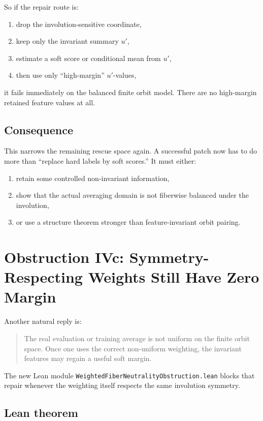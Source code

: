 \documentclass[11pt]{article}
\theoremstyle{remark}
\begin{document}
So if the repair route is:
\begin{enumerate}[leftmargin=1.5em]
  \item drop the involution-sensitive coordinate,
  \item keep only the invariant summary \(u'\),
  \item estimate a soft score or conditional mean from \(u'\),
  \item then use only ``high-margin'' \(u'\)-values,
\end{enumerate}
it fails immediately on the balanced finite orbit model.  There are no high-margin retained
feature values at all.

\subsection{Consequence}

This narrows the remaining rescue space again.  A successful patch now has to do more than
``replace hard labels by soft scores.''  It must either:
\begin{enumerate}[leftmargin=1.5em]
  \item retain some controlled non-invariant information,
  \item show that the actual averaging domain is not fiberwise balanced under the involution,
  \item or use a structure theorem stronger than feature-invariant orbit pairing.
\end{enumerate}

\section{Obstruction IVc: Symmetry-Respecting Weights Still Have Zero Margin}

Another natural reply is:
\begin{quote}
The real evaluation or training average is not uniform on the finite orbit space.  Once one uses
the correct non-uniform weighting, the invariant features may regain a useful soft margin.
\end{quote}

The new Lean module \texttt{WeightedFiberNeutralityObstruction.lean} blocks that repair whenever
the weighting itself respects the same involution symmetry.

\subsection{Lean theorem}
\end{document}
